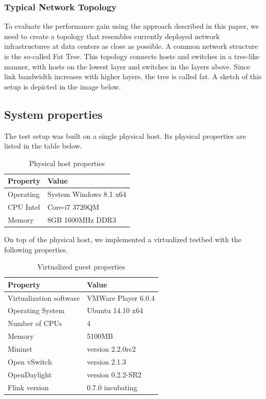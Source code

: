 \subsubsection{Typical Network Topology}
To evaluate the performance gain using the approach described in this paper, we need to create a
topology that resembles currently deployed network infrastructures at data centers as close as
possible. A common network structure is the so-called Fat Tree. \cite{datacenter} This topology
connects hosts and switches in a tree-like manner, with hosts on the lowest layer and switches in
the layers above.  Since link bandwidth increases with higher layers, the tree is called fat. A
sketch of this setup is depicted in the image below.

\subsection{System properties}
The test setup was built on a single physical host. Its physical properties are listed in the table
below.

\begin{table}[h]
    \centering
    \begin{tabular}{| l | l | }
        \hline
        \textbf{Property} & \textbf{Value} \\ \hline
        Operating &  System Windows 8.1 x64 \\ \hline
        CPU Intel & Core-i7 3720QM \\ \hline
        Memory & 8GB 1600MHz DDR3 \\ \hline
    \end{tabular}
    \caption{Physical host properties}
    \label{table:host_properties}
\end{table}

On top of the physical host, we implemented a virtualized testbed with the following properties.

\begin{table}[h]
    \centering
    \begin{tabular}{| l | l | }
        \hline
        \textbf{Property} & \textbf{Value} \\ \hline
        Virtualization software & VMWare Player 6.0.4 \\ \hline
        Operating System & Ubuntu 14.10 x64 \\ \hline
        Number of CPUs & 4 \\ \hline
        Memory & 5100MB \\ \hline
        Mininet & version 2.2.0rc2 \\ \hline
        Open vSwitch & version 2.1.3 \\ \hline
        OpenDaylight & version 0.2.2-SR2 \\ \hline
        Flink version & 0.7.0 incubating \\ \hline
    \end{tabular}
    \caption{Virtualized guest properties}
    \label{table:guest_properties}
\end{table}


